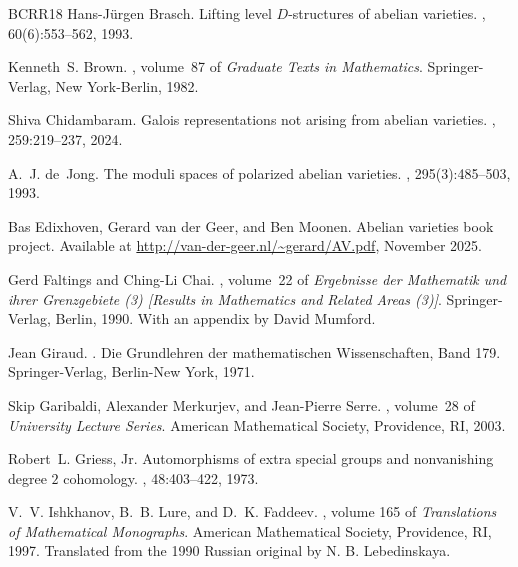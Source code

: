 \begin{thebibliography}{BCRR18}
Hans-J\"{u}rgen Brasch.
\newblock Lifting level {$D$}-structures of abelian varieties.
, 60(6):553--562, 1993.

Kenneth~S. Brown.
, volume~87 of {\em Graduate Texts in
  Mathematics}.
\newblock Springer-Verlag, New York-Berlin, 1982.

Shiva Chidambaram.
 {G}alois representations not arising from
  abelian varieties.
, 259:219--237, 2024.

A.~J. de~Jong.
\newblock The moduli spaces of polarized abelian varieties.
, 295(3):485--503, 1993.

Bas Edixhoven, Gerard van der Geer, and Ben Moonen.
\newblock Abelian varieties book project.
\newblock Available at
  \url{http://van-der-geer.nl/~gerard/AV.pdf}, November 2025.

Gerd Faltings and Ching-Li Chai.
, volume~22 of {\em Ergebnisse
  der Mathematik und ihrer Grenzgebiete (3) [Results in Mathematics and Related
  Areas (3)]}.
\newblock Springer-Verlag, Berlin, 1990.
\newblock With an appendix by David Mumford.

Jean Giraud.
.
\newblock Die Grundlehren der mathematischen Wissenschaften, Band 179.
  Springer-Verlag, Berlin-New York, 1971.

Skip Garibaldi, Alexander Merkurjev, and Jean-Pierre Serre.
, volume~28 of
  {\em University Lecture Series}.
\newblock American Mathematical Society, Providence, RI, 2003.

Robert~L. Griess, Jr.
\newblock Automorphisms of extra special groups and nonvanishing degree {$2$}
  cohomology.
, 48:403--422, 1973.

V.~V. Ishkhanov, B.~B. Lure, and D.~K. Faddeev.
, volume 165 of {\em
  Translations of Mathematical Monographs}.
\newblock American Mathematical Society, Providence, RI, 1997.
\newblock Translated from the 1990 Russian original by N. B. Lebedinskaya.


\end{thebibliography}
